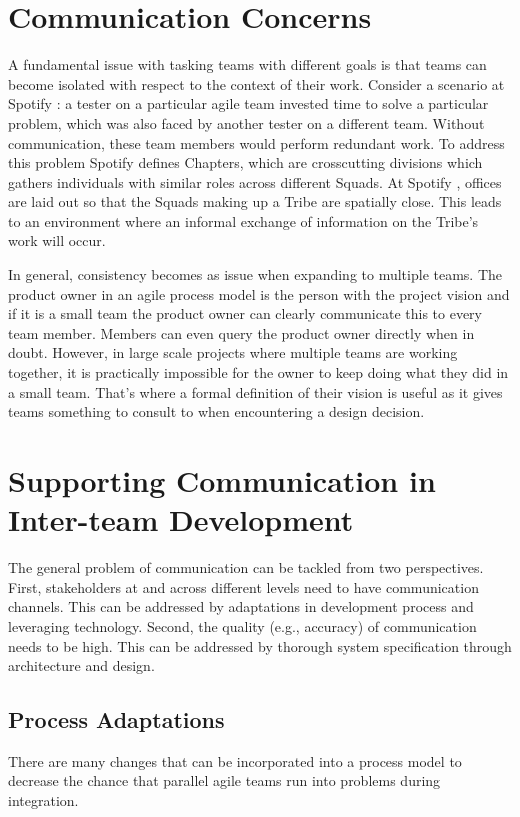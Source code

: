 ﻿\section{Communication Concerns}\label{sec:spt_ex} 
A fundamental issue with tasking teams with different goals is that teams can become isolated with respect to the context of their work.
Consider a scenario at Spotify \cite{kniberg12}: a tester on a particular agile team invested time to solve a particular problem, which was also faced by another tester on a different team. Without communication, these team members would perform redundant work.
To address this problem Spotify defines Chapters, which are crosscutting divisions which gathers individuals with similar roles across different Squads. 
At Spotify \cite{kniberg12}, offices are laid out so that the Squads making up a Tribe are spatially close. This leads to an environment where an informal exchange of information on the Tribe's work will occur.

In general, consistency becomes as issue when expanding to multiple teams.
The product owner in an agile process model is the person with the project vision and if it is a small team the product owner can clearly communicate this to every team member.
Members can even query the product owner directly when in doubt.
However, in large scale projects where multiple teams are working together, it is practically impossible for the owner to keep doing what they did in a small team.
That’s where a formal definition of their vision is useful as it gives teams something to consult to when encountering a design decision.

\section{Supporting Communication in Inter-team Development}
\label{sec:prop_appro} 
The general problem of communication can be tackled from two perspectives.
First, stakeholders at and across different levels need to have communication channels.
This can be addressed by adaptations in development process and leveraging technology.
Second, the quality (e.g., accuracy) of communication needs to be high.
This can be addressed by thorough system specification through architecture and design.

\subsection{Process Adaptations} 
\label{sec:proc_impv}
	There are many changes \cite{collabAcrossAgile_article} that can be incorporated into a process model to decrease the chance that parallel agile teams run into problems during integration.

